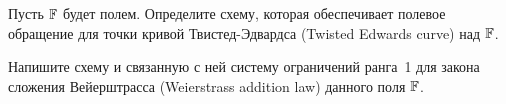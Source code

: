 \begin{exercise}
Пусть $\mathbb{F}$ будет полем. Определите схему, которая обеспечивает полевое обращение для точки кривой Твистед-Эдвардса (Twisted Edwards curve) над $\mathbb{F}$.
\end{exercise}
\begin{exercise}
Напишите схему и связанную с ней систему ограничений ранга~1 для закона сложения Вейерштрасса (Weierstrass addition law) данного поля $\mathbb{F}$.
\end{exercise}
